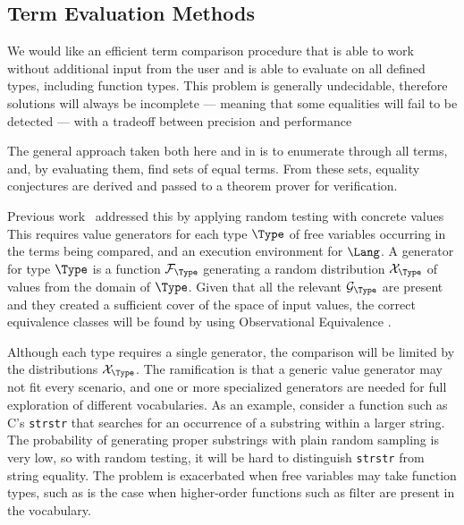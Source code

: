\subsection{Term Evaluation Methods}
\label{screening:evaluation}

We would like an efficient term comparison procedure that is able to work without additional input from the user and is able to evaluate on all defined types, including function types.
This problem is generally undecidable, therefore solutions will always be incomplete --- meaning that
some equalities will fail to be detected --- with a tradeoff between precision and performance

The general approach taken both here and in \cite{ICAD2013:Claessen} is to enumerate through all terms, and, by evaluating them, find sets of equal terms.
From these sets, equality conjectures are derived and passed to a theorem prover for verification.

Previous work~\cite{JFP2017:Smallbonequickspec2} addressed this by applying random testing with concrete values %
This requires value generators for each type $\Type$ of free variables occurring in the terms being compared, and an execution environment for $\Lang$.
A generator for type $\Type$ is a function $\mathcal{F}_\Type$ generating a random distribution $\mathcal{X}_\Type$ of values from the domain of $\Type$. 
Given that all the relevant $\mathcal{G}_\Type$ are present and they created a sufficient cover of the space of input values, the correct equivalence classes will be found by using Observational Equivalence \cite{CAV2103:Albarghouthi}. %

Although each type requires a single generator, the comparison will be limited by the distributions $\mathcal{X}_\Type$. 
The ramification is that a generic value generator may not fit every scenario, and one or more specialized generators are needed for full exploration of different vocabularies.
As an example, consider a function such as C's \texttt{strstr} that searches for an occurrence of a substring within a larger string.
The probability of generating proper substrings with plain random sampling is very low, so with
random testing, it will be hard to distinguish \texttt{strstr} from string equality.
The problem is exacerbated when free variables may take function types, such as is the case when
higher-order functions such as $\textrm{filter}$ are present in the vocabulary.

